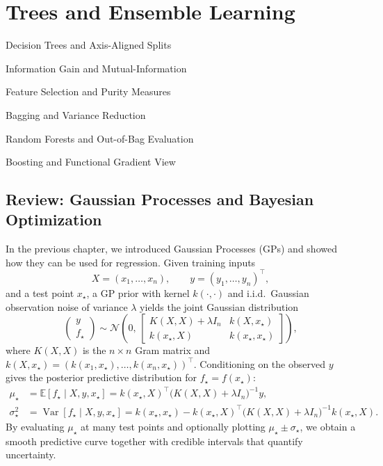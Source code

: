 \documentclass[../main]{subfiles}
\begin{document}
\chapter{Trees and Ensemble Learning}
\begin{introduction}
    \item Decision Trees and Axis-Aligned Splits
    \item Information Gain and Mutual-Information
    \item Feature Selection and Purity Measures
    \item Bagging and Variance Reduction
    \item Random Forests and Out-of-Bag Evaluation
    \item Boosting and Functional Gradient View
\end{introduction}

\section*{Review: Gaussian Processes and Bayesian Optimization}

In the previous chapter, we introduced Gaussian Processes (GPs) and showed how
they can be used for regression.  Given training inputs
\begin{equation}
    X = (x_1,\dots,x_n), \qquad
    y = (y_1,\dots,y_n)^\top,
\end{equation}
and a test point $x_\star$, a GP prior with kernel $k(\cdot,\cdot)$ and i.i.d.\
Gaussian observation noise of variance $\lambda$ yields the joint Gaussian
distribution
\begin{equation}
    \begin{pmatrix}
        y\\[2pt]
        f_\star
    \end{pmatrix}
    \sim
    \mathcal{N}\!\left(
        0,\,
        \begin{bmatrix}
            K(X,X) + \lambda I_n
            & k(X,x_\star)\\[2pt]
            k(x_\star,X) & k(x_\star,x_\star)
        \end{bmatrix}
    \right),
\end{equation}
where $K(X,X)$ is the $n\times n$ Gram matrix and
$k(X,x_\star) = (k(x_1,x_\star),\dots,k(x_n,x_\star))^\top$.
Conditioning on the observed $y$ gives the posterior predictive distribution
for $f_\star = f(x_\star)$:
\begin{align}
    \mu_\star
    &= \mathbb{E}[f_\star \mid X,y,x_\star]
      = k(x_\star,X)^\top
        \bigl(K(X,X)+\lambda I_n\bigr)^{-1} y,
        \label{eq:gp-posterior-mean}\\
    \sigma_\star^2
    &= \operatorname{Var}[f_\star \mid X,y,x_\star]
      = k(x_\star,x_\star)
        - k(x_\star,X)^\top
          \bigl(K(X,X)+\lambda I_n\bigr)^{-1}
          k(x_\star,X).
        \label{eq:gp-posterior-var}
\end{align}
By evaluating $\mu_\star$ at many test points and optionally plotting
$\mu_\star \pm \sigma_\star$, we obtain a smooth predictive curve together with
credible intervals that quantify uncertainty.
\end{document}
